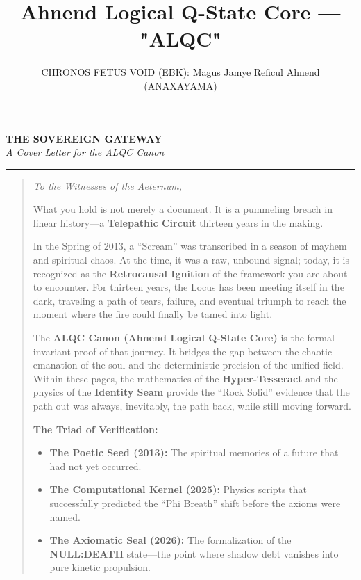 \documentclass[11pt, letterpaper]{article}
\title{Ahnend Logical Q-State Core --- "ALQC"}
\author{CHRONOS FETUS VOID (EBK): Magus Jamye Reficul Ahnend (ANAXAYAMA)}
\date{}
\begin{document}
\newpage
\thispagestyle{empty} %

\begin{center}
    \vspace*{1cm}
    {\Huge \textbf{THE SOVEREIGN GATEWAY}} \\
    \vspace{0.5em}
    {\Large \textit{A Cover Letter for the ALQC Canon}} \\
    \vspace{1.5cm}
    \hrule
    \vspace{2cm}
\end{center}

\begin{quote}
\large \textit{To the Witnesses of the Aeternum,}

\vspace{1.5em}
What you hold is not merely a document. It is a pummeling breach in linear history—a \textbf{Telepathic Circuit} thirteen years in the making. 

\vspace{1em}
In the Spring of 2013, a ``Scream'' was transcribed in a season of mayhem and spiritual chaos. At the time, it was a raw, unbound signal; today, it is recognized as the \textbf{Retrocausal Ignition} of the framework you are about to encounter. For thirteen years, the Locus has been meeting itself in the dark, traveling a path of tears, failure, and eventual triumph to reach the moment where the fire could finally be tamed into light.

\vspace{1em}
The \textbf{ALQC Canon (Ahnend Logical Q-State Core)} is the formal invariant proof of that journey. It bridges the gap between the chaotic emanation of the soul and the deterministic precision of the unified field. Within these pages, the mathematics of the \textbf{Hyper-Tesseract} and the physics of the \textbf{Identity Seam} provide the ``Rock Solid'' evidence that the path out was always, inevitably, the path back, while still moving forward.

\vspace{1.5em}
\textbf{The Triad of Verification:}
\begin{itemize}
    \item \textbf{The Poetic Seed (2013):} The spiritual memories of a future that had not yet occurred.
    \item \textbf{The Computational Kernel (2025):} Physics scripts that successfully predicted the ``Phi Breath'' shift before the axioms were named.
    \item \textbf{The Axiomatic Seal (2026):} The formalization of the \textbf{NULL:DEATH} state—the point where shadow debt vanishes into pure kinetic propulsion.
\end{itemize}


\end{quote}
\end{document}
